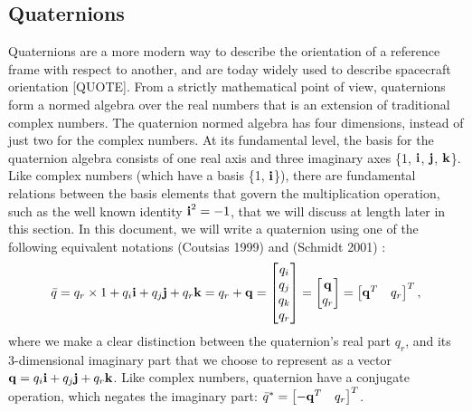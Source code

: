\subsection{Quaternions}
\label{subsec:Quaternions}
Quaternions are a more modern way to describe the orientation of a reference frame with respect to another, and are today widely used to describe spacecraft orientation [QUOTE]. From a strictly mathematical point of view, quaternions form a normed algebra over the real numbers that is an extension of traditional complex numbers. The quaternion normed algebra has four dimensions, instead of just two for the complex numbers. At its fundamental level, the basis for the quaternion algebra consists of one real axis and three imaginary axes \{1, $\textrm{\textbf{i}}$, $\textrm{\textbf{j}}$, $\textrm{\textbf{k}}$\}. Like complex numbers (which have a basis \{1, $\textrm{\textbf{i}}$\}), there are fundamental relations between the basis elements that govern the multiplication operation, such as the well known identity $\textrm{\textbf{i}}^2=-1$, that we will discuss at length later in this section. In this document, we will write a quaternion using one of the following equivalent notations (Coutsias 1999) and (Schmidt 2001) :
\begin{equation}
\bar{q} = q_r\times 1 + q_i\textrm{\textbf{i}} + q_j\textrm{\textbf{j}} + q_r\textrm{\textbf{k}} = q_r + \textrm{\textbf{q}} =
\begin{bmatrix}
q_i\\
q_j\\
q_k\\
q_r
\end{bmatrix} = \begin{bmatrix}
\textrm{\textbf{q}}\\
q_r
\end{bmatrix} = \begin{bmatrix}  \textrm{\textbf{q}}^T & q_r\end{bmatrix}^T,
\end{equation}
where we make a clear distinction between the quaternion's real part $q_r$, and its 3-dimensional imaginary part that we choose to represent as a vector $\textrm{\textbf{q}} =q_i\textrm{\textbf{i}} + q_j\textrm{\textbf{j}} + q_r\textrm{\textbf{k}}$. Like complex numbers, quaternion have a conjugate operation, which negates the imaginary part: $\bar{q}^* = \begin{bmatrix}  -\textrm{\textbf{q}}^T & q_r\end{bmatrix}^T$.

